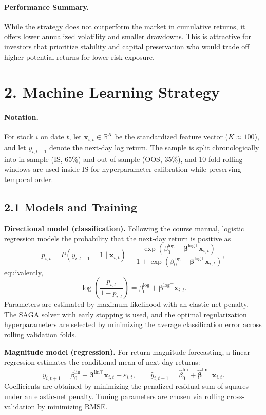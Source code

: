 \documentclass[11pt,a4paper]{article}
\begin{document}
    \paragraph{Performance Summary.}
    While the strategy does not outperform the market in cumulative returns, it offers lower annualized volatility and smaller drawdowns. This is attractive for investors that prioritize stability and capital preservation who would trade off higher potential returns for lower risk exposure.
    \vspace{1em}
    \section*{2. Machine Learning Strategy}

    \paragraph{Notation.}
    For stock $i$ on date $t$, let $\mathbf{x}_{i,t}\in\mathbb{R}^{K}$ be the standardized feature vector ($K\approx 100$), and let
    $y_{i,t+1}$ denote the next-day log return. The sample is split chronologically into in-sample (IS, 65\%) and out-of-sample (OOS, 35\%), and 10-fold rolling windows are used inside IS for hyperparameter calibration while preserving temporal order.

    \subsection*{2.1 Models and Training}

    \textbf{Directional model (classification).}
    Following the course manual, logistic regression models the probability that the next-day return is positive as
    \[
        p_{i,t} = P(y_{i,t+1} = 1 \mid \mathbf{x}_{i,t})
        = \frac{\exp(\beta^{\text{log}}_0 + \boldsymbol{\beta}^{\text{log}\top}\mathbf{x}_{i,t})}
        {1 + \exp(\beta^{\text{log}}_0 + \boldsymbol{\beta}^{\text{log}\top}\mathbf{x}_{i,t})},
    \]
    equivalently,
    \[
        \log\!\left(\frac{p_{i,t}}{1 - p_{i,t}}\right)
        = \beta^{\text{log}}_0 + \boldsymbol{\beta}^{\text{log}\top}\mathbf{x}_{i,t}.
    \]
    Parameters are estimated by maximum likelihood with an elastic-net penalty. The SAGA solver with early stopping is used, and the optimal regularization hyperparameters are selected by minimizing the average classification error across rolling validation folds.

    \medskip
    \textbf{Magnitude model (regression).}
    For return magnitude forecasting, a linear regression estimates the conditional mean of next-day returns:
    \[
        y_{i,t+1}
        = \beta^{\text{lin}}_0 + \boldsymbol{\beta}^{\text{lin}\top}\mathbf{x}_{i,t} + \varepsilon_{i,t},
        \qquad
        \hat{y}_{i,t+1} = \hat{\beta}^{\text{lin}}_0 + \hat{\boldsymbol{\beta}}^{\text{lin}\top}\mathbf{x}_{i,t}.
    \]
    Coefficients are obtained by minimizing the penalized residual sum of squares under an elastic-net penalty. Tuning parameters are chosen via rolling cross-validation by minimizing RMSE.
\end{document}

